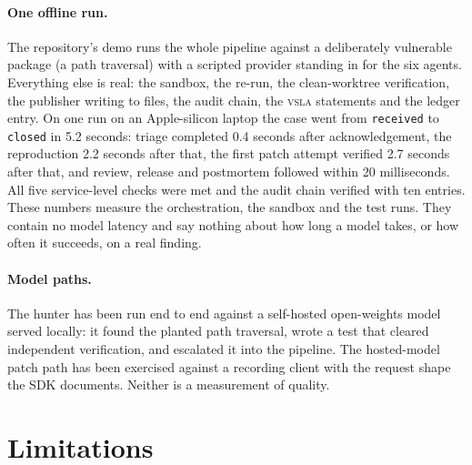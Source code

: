 \documentclass[11pt]{article}
\newcommand{\vsla}{\textsc{vsla}}
\newcommand{\code}[1]{\texttt{\small #1}}
\begin{document}
\paragraph{One offline run.} The repository's demo runs the whole pipeline against a deliberately vulnerable
package (a path traversal) with a scripted provider standing in for the six agents. Everything else is real:
the sandbox, the re-run, the clean-worktree verification, the publisher writing to files, the audit chain, the
\vsla{} statements and the ledger entry. On one run on an Apple-silicon laptop the case went from
\code{received} to \code{closed} in 5.2 seconds: triage completed 0.4 seconds after acknowledgement, the
reproduction 2.2 seconds after that, the first patch attempt verified 2.7 seconds after that, and review, release
and postmortem followed within 20 milliseconds. All five service-level checks were met and the audit chain
verified with ten entries. These numbers measure the orchestration, the sandbox and the test runs. They contain
no model latency and say nothing about how long a model takes, or how often it succeeds, on a real finding.

\paragraph{Model paths.} The hunter has been run end to end against a self-hosted open-weights model served
locally: it found the planted path traversal, wrote a test that cleared independent verification, and escalated
it into the pipeline. The hosted-model patch path has been exercised against a recording client with the
request shape the SDK documents. Neither is a measurement of quality.

\section{Limitations}
\label{sec:limits}
\end{document}
